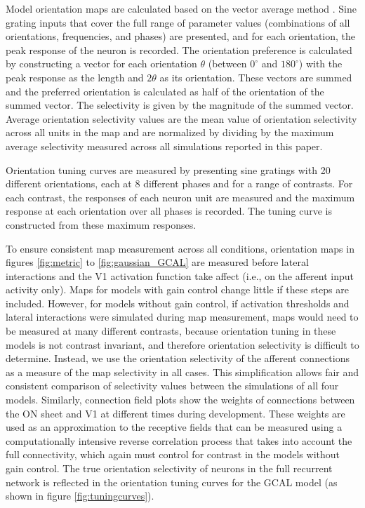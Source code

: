 \documentclass{article}
\begin{document}
Model orientation maps are calculated based on the vector average method
\citep{Miikkulainen2005,Blasdel1986}. Sine grating inputs that cover
the full range of parameter values (combinations of all orientations,
frequencies, and phases) are presented, and for each orientation, the
peak response of the neuron is recorded. The orientation preference is
calculated by constructing a vector for each orientation $\theta$
(between $0^{\circ}$ and $180^{\circ}$) with the peak response as the
length and $2\theta$ as its orientation. These vectors are summed and
the preferred orientation is calculated as half of the orientation of
the summed vector. The selectivity is given by the magnitude of the
summed vector. Average orientation selectivity values are the mean
value of orientation selectivity across all units in the map and are
normalized by dividing by the maximum average selectivity measured
across all simulations reported in this paper.

Orientation tuning curves are measured by presenting sine gratings
with 20 different orientations, each at 8 different phases and for a
range of contrasts. For each contrast, the responses of each neuron
unit are measured and the maximum response at each orientation over
all phases is recorded. The tuning curve is constructed from these
maximum responses.

To ensure consistent map measurement across all conditions,
orientation maps in figures \ref{fig:metric} to
\ref{fig:gaussian_GCAL} are measured before lateral interactions and
the V1 activation function take affect (i.e., on the afferent input
activity only). Maps for models with gain control change little if
these steps are included.  However, for models without gain control,
if activation thresholds and lateral interactions were simulated
during map measurement, maps would need to be measured at many
different contrasts, because orientation tuning in these models is not
contrast invariant, and therefore orientation selectivity is difficult
to determine.  Instead, we use the orientation selectivity of the
afferent connections as a measure of the map selectivity in all
cases. This simplification allows fair and consistent comparison of
selectivity values between the simulations of all four models.
Similarly, connection field plots show the weights of connections
between the ON sheet and V1 at different times during development.
These weights are used as an approximation to the receptive fields
that can be measured using a computationally intensive reverse
correlation process that takes into account the full connectivity,
which again must control for contrast in the models without gain
control. The true orientation selectivity of neurons in the full
recurrent network is reflected in the orientation tuning curves for
the GCAL model (as shown in figure \ref{fig:tuningcurves}).
\end{document}
